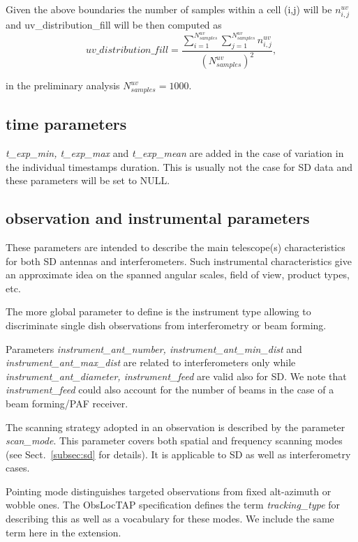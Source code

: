 \documentclass[11pt,a4paper]{ivoa}
\begin{document}
Given the above boundaries the number of samples within a cell (i,j) will be $n^{uv}_{i,j}$
and uv\_distribution\_fill will be then computed as
\begin{equation}
uv\_distribution\_fill = \frac{\sum^{N^{uv}_{samples}}_{i=1} \sum^{N^{uv}_{samples}}_{j=1}
n^{uv}_{i,j} }{(N^{uv}_{samples}) ^ 2},
\end{equation}

in the preliminary analysis $N^{uv}_{samples} = 1000$.



\subsection{time parameters}
\emph{t\_exp\_min, t\_exp\_max }and \emph{t\_exp\_mean} are added in the case of variation in the individual timestamps
duration. This is usually not the case for SD data and these parameters will be set to NULL.


\subsection{observation and instrumental parameters}
These parameters are intended to describe the main telescope(s) characteristics for both SD antennas and interferometers. 
Such instrumental characteristics give an approximate idea on the spanned angular scales, field of view, product types, etc.

The more global parameter to define is the instrument type allowing to discriminate single dish observations from interferometry or beam forming.

Parameters \emph{instrument\_ant\_number, instrument\_ant\_min\_dist} and  \emph{instrument\_ant\_max\_dist} are related to interferometers only while 
\emph{instrument\_ant\_diameter, instrument\_feed } are valid also for SD.
We note that \emph{instrument\_feed} could also  account for the number of beams in the case of a beam forming/PAF receiver.


The scanning strategy adopted in an observation is described by the parameter \emph{scan\_mode}. This parameter covers both spatial
and frequency scanning modes (see Sect.~\ref{subsec:sd} for details).
It is applicable to  SD as well as  interferometry cases.

Pointing mode distinguishes targeted observations from  fixed alt-azimuth or wobble ones. The ObsLocTAP specification \citep{2021ivoa.spec.0724S} defines the term \emph{tracking\_type} for describing this as well as a  vocabulary for these modes. 
We include the same term here in the extension.
\end{document}
